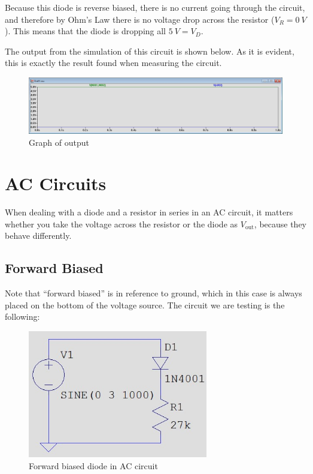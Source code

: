 \documentclass{article}
\begin{document}
Because this diode is reverse biased, there is no current going
through the circuit, and therefore by Ohm's Law there is no
voltage drop across the resistor (\(V_R = \SI{0}{V}\)).
This means that the diode is dropping all \(\SI{5}{V} = V_D\).

The output from the simulation of this circuit is shown below. As
it is evident, this is exactly the result found when
measuring the circuit.

\begin{figure}[h]
    \centering
    \includegraphics[width=\textwidth]{Images/5VReverse.jpg}
    \caption{Graph of output}
\end{figure}

\section{AC Circuits} When dealing
with a diode and a resistor in series in an AC circuit,
it matters whether you take the voltage across the resistor
or the diode as \(V_\text{out}\), because they behave
differently.
\subsection{Forward Biased} Note that ``forward biased''
is in reference to ground, which in this case is always placed
on the bottom of the voltage source.
The circuit
we are testing is the following:

\begin{figure}[h]
    \centering
    \includegraphics[height=15em]{Images/Circuit2.jpg}
    \caption{Forward biased diode in AC circuit}
\end{figure}
\end{document}
